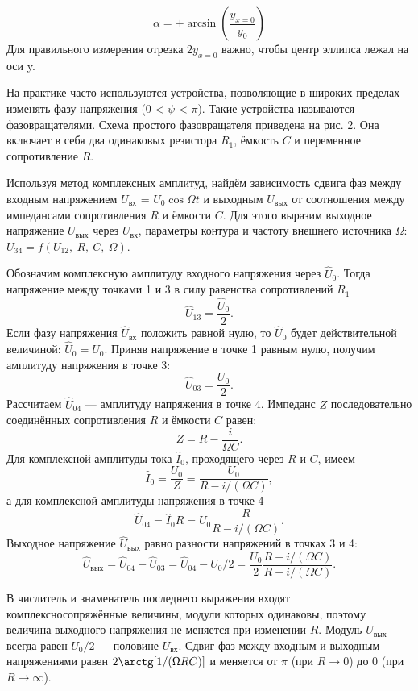 $$\alpha = \pm \arcsin{\left( \frac{y_{x=0}}{y_0}\right)}$$
Для правильного измерения отрезка $2y_{x=0}$ важно, чтобы центр эллипса лежал на оси y.

На практике часто используются устройства, позволяющие в широких пределах изменять фазу напряжения (0 < $\psi$ < $\pi$). Такие устройства называются фазовращателями. Схема простого фазовращателя приведена на рис. 2. Она включает в себя два одинаковых резистора $R_1$, ёмкость $C$ и переменное сопротивление $R$.

Используя метод комплексных амплитуд, найдём зависимость сдвига фаз между входным напряжением $U_{\text{вх}}$ = $U_0 \cos{\Omega t}$ и выходным $U_{\text{вых}}$ от соотношения между импедансами сопротивления $R$ и ёмкости $C$. Для этого выразим выходное напряжение $U_{\text{вых}}$ через $U_{\text{вх}}$, параметры контура и частоту внешнего источника $\Omega$: $U_{34} = f(U_{12},~R,~C,~\Omega)$.

Обозначим комплексную амплитуду входного напряжения через $\widehat{U}_0$. Тогда напряжение между точками 1 и 3 в силу равенства сопротивлений $R_1$
$$ \widehat{U}_{13} = \frac{\widehat{U}_0}{2}. $$
Если фазу напряжения $\widehat{U}_{\text{вх}}$ положить равной нулю, то $\widehat{U}_0$ будет действительной величиной: $\widehat{U}_0 = U_0$. Приняв напряжение в точке 1 равным нулю, получим амплитуду напряжения в точке 3:
$$ \widehat{U}_{03} = \frac{U_0}{2}. $$
Рассчитаем $\widehat{U}_{04}$ — амплитуду напряжения в точке 4. Импеданс $Z$ последовательно соединённых сопротивления $R$ и ёмкости $C$ равен:
$$ Z = R - \frac{i}{\Omega C}. $$
Для комплексной амплитуды тока $\widehat{I}_0$, проходящего через $R$ и $C$, имеем
$$ \widehat{I}_0 = \frac{U_0}{Z} = \frac{U_0}{R - i/(\Omega C)},$$
а для комплексной амплитуды напряжения в точке 4
$$ \widehat{U}_{04} = \widehat{I}_0 R = U_0 \frac{R}{R - i/(\Omega C)}.$$
Выходное напряжение $\widehat{U}_{\text{вых}}$ равно разности напряжений в точках 3 и 4:
$$\widehat{U}_{\text{вых}} = \widehat{U}_{04} - \widehat{U}_{03} = \widehat{U}_{04} - U_0 /2 = \frac{U_0}{2} \frac{R + i/(\Omega C)}{R - i/(\Omega C)}.$$

В числитель и знаменатель последнего выражения входят комплексносопряжённые величины, модули которых одинаковы, поэтому величина выходного напряжения не меняется при изменении $R$. Модуль $U_{\text{вых}}$ всегда равен $U_0 /2$ — половине $U_{\text{вх}}$. Сдвиг фаз между входным и выходным напряжениями равен $2 \arctg[1/(\Omega R C)]$ и меняется от $\pi$ (при $R \rightarrow 0$) до 0 (при $R \rightarrow \infty$).

